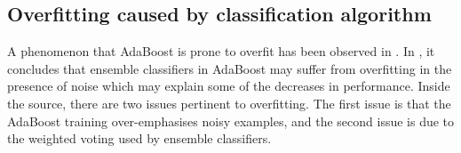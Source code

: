 
\subsection{Overfitting caused by classification algorithm}
A phenomenon that AdaBoost is prone to overfit has been observed in \cite{Grove1998,Mason1999}. In \cite{Opitz1999}, it concludes that ensemble classifiers in AdaBoost may suffer from overfitting in the presence of noise which may explain some of the decreases in performance. Inside the source, there are two issues pertinent to overfitting. The first issue is that the AdaBoost training over-emphasises noisy examples, and the second issue is due to the weighted voting used by ensemble classifiers.

